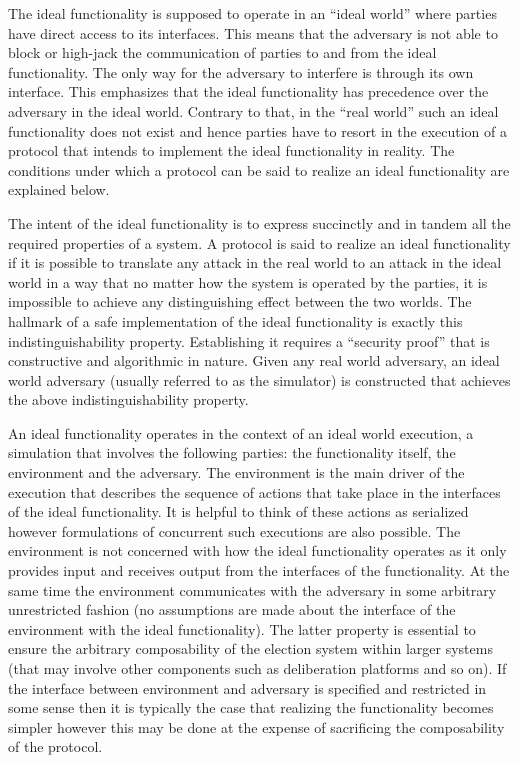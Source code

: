 The ideal functionality is supposed to operate in an ``ideal world''
where parties have direct access to its interfaces. This means that
the adversary is not able to block or high-jack the communication of
parties to and from the ideal functionality. The only way for the
adversary to interfere is through its own interface. This emphasizes
that the ideal functionality has precedence over the adversary in the
ideal world. Contrary to that, in the “real world” such an ideal
functionality does not exist and hence parties have to resort in the
execution of a protocol that intends to implement the ideal
functionality in reality. The conditions under which a protocol can be
said to realize an ideal functionality are explained below.

The intent of the ideal functionality is to express succinctly and in
tandem all the required properties of a system. A protocol is said to
realize an ideal functionality if it is possible to translate any
attack in the real world to an attack in the ideal world in a way that
no matter how the system is operated by the parties, it is impossible
to achieve any distinguishing effect between the two worlds. The
hallmark of a safe implementation of the ideal functionality is
exactly this indistinguishability property. Establishing it requires a
“security proof” that is constructive and algorithmic in nature. Given
any real world adversary, an ideal world adversary (usually referred
to as the simulator) is constructed that achieves the above
indistinguishability property.

An ideal functionality operates in the context of an ideal world
execution, a simulation that involves the following parties: the
functionality itself, the environment and the adversary. The
environment is the main driver of the execution that describes the
sequence of actions that take place in the interfaces of the ideal
functionality. It is helpful to think of these actions as serialized
however formulations of concurrent such executions are also
possible. The environment is not concerned with how the ideal
functionality operates as it only provides input and receives output
from the interfaces of the functionality. At the same time the
environment communicates with the adversary in some arbitrary
unrestricted fashion (no assumptions are made about the interface of
the environment with the ideal functionality). The latter property is
essential to ensure the arbitrary composability of the election system
within larger systems (that may involve other components such as
deliberation platforms and so on). If the interface between
environment and adversary is specified and restricted in some sense
then it is typically the case that realizing the functionality becomes
simpler however this may be done at the expense of sacrificing the
composability of the protocol.

